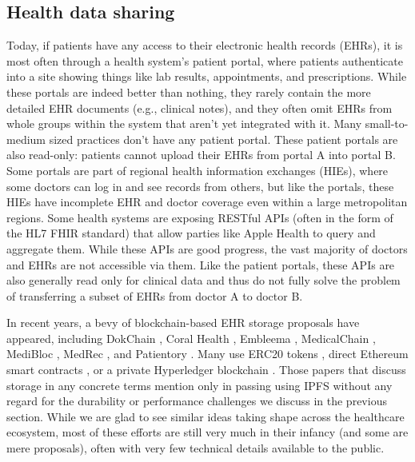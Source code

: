 \documentclass[10pt]{article}
\begin{document}
\subsection{Health data sharing}
Today, if patients have any access to their electronic health records (EHRs), it is most often through a health system's patient portal, where patients authenticate into a site showing things like lab results, appointments, and prescriptions. While these portals are indeed better than nothing, they rarely contain the more detailed EHR documents (e.g., clinical notes), and they often omit EHRs from whole groups within the system that aren't yet integrated with it. Many small-to-medium sized practices don't have any patient portal. These patient portals are also read-only: patients cannot upload their EHRs from portal A into portal B. Some portals are part of regional health information exchanges (HIEs), where some doctors can log in and see records from others, but like the portals, these HIEs have incomplete EHR and doctor coverage even within a large metropolitan regions. Some health systems are exposing RESTful APIs (often in the form of the HL7 FHIR standard) that allow  parties like Apple Health to query and aggregate them. While these APIs are good progress, the vast majority of doctors and EHRs are not accessible via them. Like the patient portals, these APIs are also generally read only for clinical data and thus do not fully solve the problem of transferring a subset of EHRs from doctor A to doctor B.

In recent years, a bevy of blockchain-based EHR storage proposals have appeared, including DokChain \cite{dokchain}, Coral Health \cite{coralhealth}, Embleema \cite{embleema}, MedicalChain \cite{medicalchain}, MediBloc \cite{medibloc}, MedRec \cite{medrec}, and Patientory \cite{patientory}. Many use ERC20 tokens \cite{coralhealth,medibloc}, direct Ethereum smart contracts \cite{medrec,patientory}, or a private Hyperledger blockchain \cite{dokchain,medicalchain}. Those papers \cite{dokchain,coralhealth,medibloc} that discuss storage in any concrete terms mention only in passing using IPFS without any regard for the durability or performance challenges we discuss in the previous section. While we are glad to see similar ideas taking shape across the healthcare ecosystem, most of these efforts are still very much in their infancy (and some are mere proposals), often with very few technical details available to the public. 
\end{document}
